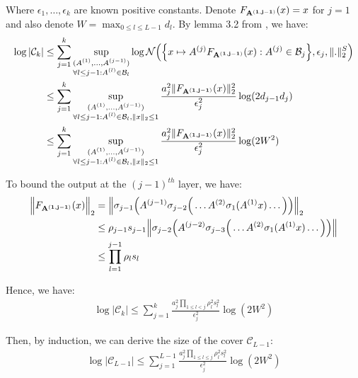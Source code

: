 \noindent Where $\epsilon_1, \dots, \epsilon_k$ are known positive constants. Denote $F_{\bf A^{(1, j-1)}}(x)=x$ for $j=1$ and also denote $W=\max_{0\le l \le L-1}d_l$. By lemma 3.2 from \cite{article:bartlett}, we have:
\begin{align*}
    \log|\mathcal{C}_k| 
    &\le \sum_{j=1}^k\sup_{
        \substack{
            (A^{(1)}, \dots, A^{(j-1)}) \\ \forall l \le j-1: A^{(l)}\in\mathcal{B}_l
        }
    }\log\mathcal{N}\Big( 
        \Big\{ 
            x \mapsto A^{(j)}F_{\bf A^{(1, j-1)}}(x) : A^{(j)} \in \mathcal{B}_j
         \Big\}, \epsilon_j, \|.\|_2^S
     \Big) \\
    &\le \sum_{j=1}^k\sup_{
        \substack{
            (A^{(1)}, \dots, A^{(j-1)}) \\ \forall l \le j-1: A^{(l)}\in\mathcal{B}_l, \|x\|_2 \le 1
        }
    }\frac{a_j^2\|F_{\bf A^{(1, j-1)}}(x)\|_2^2}{\epsilon_j^2}\log(2d_{j-1}d_j) \\
    &\le \sum_{j=1}^k\sup_{
        \substack{
            (A^{(1)}, \dots, A^{(j-1)}) \\ \forall l \le j-1: A^{(l)}\in\mathcal{B}_l, \|x\|_2 \le 1
        }
    }\frac{a_j^2\|F_{\bf A^{(1, j-1)}}(x)\|_2^2}{\epsilon_j^2}\log(2W^2) \\
\end{align*}

\noindent To bound the output at the $(j-1)^{th}$ layer, we have:
\begin{align*}
    \Big\|
        F_{\bf A^{(1, j-1)}}(x)
    \Big\|_2 &= \Big\|
        \sigma_{j-1}\Big( A^{(j-1)}\sigma_{j-2}\Big( \dots A^{(2)}\sigma_1(A^{(1)}x) \dots \Big) \Big)
    \Big\|_2 \\
    &\le \rho_{j-1}s_{j-1} \Big\|
        \sigma_{j-2}\Big( A^{(j-2)}\sigma_{j-3}\Big( \dots A^{(2)}\sigma_1(A^{(1)}x) \dots \Big) \Big)
    \Big\| \\
    &\le \prod_{l=1}^{j-1}\rho_l s_l
\end{align*}

\noindent Hence, we have:
\begin{align*}
    \log|\mathcal{C}_k| \le \sum_{j=1}^k \frac{a_j^2\prod_{1\le l < j} \rho_l^2s_l^2}{\epsilon_j^2}\log(2W^2)
\end{align*}

\noindent Then, by induction, we can derive the size of the cover $\mathcal{C}_{L-1}$:
\begin{align*}
    \log|\mathcal{C}_{L-1}| \le \sum_{j=1}^{L-1}\frac{a_j^2\prod_{1\le l \le j}\rho_l^2s_l^2}{\epsilon_j^2}\log(2W^2)
\end{align*}

